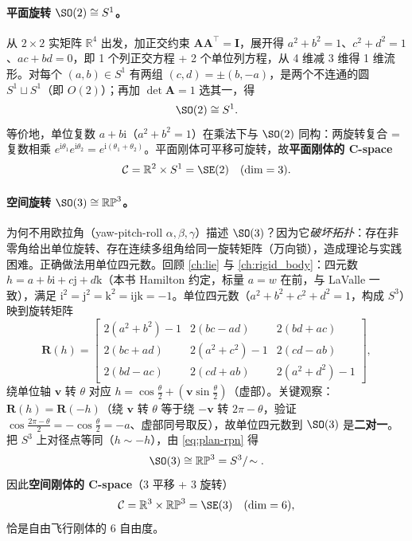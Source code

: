 \paragraph{平面旋转 $\SO(2)\cong S^1$。}
从 $2\times2$ 实矩阵 $\mathbb{R}^4$ 出发，加正交约束 $\mathbf{A}\mathbf{A}^\top=\mathbf{I}$，展开得 $a^2+b^2=1$、$c^2+d^2=1$、$ac+bd=0$，即 1 个列正交方程 + 2 个单位列方程，从 4 维减 3 维得 1 维流形。对每个 $(a,b)\in S^1$ 有两组 $(c,d)=\pm(b,-a)$，是两个不连通的圆 $S^1\sqcup S^1$（即 $O(2)$）；再加 $\det\mathbf{A}=1$ 选其一，得
\begin{equation}
  \SO(2)\cong S^1.
  \label{eq:plan-so2}
\end{equation}
等价地，单位复数 $a+b\mathrm{i}$（$a^2+b^2=1$）在乘法下与 $\SO(2)$ 同构：两旋转复合 = 复数相乘 $e^{\mathrm{i}\theta_1}e^{\mathrm{i}\theta_2}=e^{\mathrm{i}(\theta_1+\theta_2)}$。平面刚体可平移可旋转，故\textbf{平面刚体的 C-space}
\begin{equation}
  \mathcal{C}=\mathbb{R}^2\times S^1=\SE(2)\quad(\dim=3).
  \label{eq:plan-se2}
\end{equation}

\paragraph{空间旋转 $\SO(3)\cong\mathbb{RP}^3$。}
为何不用欧拉角（yaw-pitch-roll $\alpha,\beta,\gamma$）描述 $\SO(3)$？因为它\emph{破坏拓扑}：存在非零角给出单位旋转、存在连续多组角给同一旋转矩阵（万向锁），造成理论与实践困难。正确做法用单位四元数。回顾 \cref{ch:lie} 与 \cref{ch:rigid_body}：四元数 $h=a+b\mathrm{i}+c\mathrm{j}+d\mathrm{k}$（本书 Hamilton 约定，标量 $a=w$ 在前，与 LaValle 一致），满足 $\mathrm{i}^2=\mathrm{j}^2=\mathrm{k}^2=\mathrm{i}\mathrm{j}\mathrm{k}=-1$。单位四元数（$a^2+b^2+c^2+d^2=1$，构成 $S^3$）映到旋转矩阵
\begin{equation}
  \mathbf{R}(h)=\begin{bmatrix}2(a^2+b^2)-1&2(bc-ad)&2(bd+ac)\\2(bc+ad)&2(a^2+c^2)-1&2(cd-ab)\\2(bd-ac)&2(cd+ab)&2(a^2+d^2)-1\end{bmatrix},
  \label{eq:plan-quat2rot}
\end{equation}
绕单位轴 $\mathbf{v}$ 转 $\theta$ 对应 $h=\cos\tfrac\theta2+(\mathbf{v}\sin\tfrac\theta2)$（虚部）。关键观察：$\mathbf{R}(h)=\mathbf{R}(-h)$（绕 $\mathbf{v}$ 转 $\theta$ 等于绕 $-\mathbf{v}$ 转 $2\pi-\theta$，验证 $\cos\tfrac{2\pi-\theta}2=-\cos\tfrac\theta2=-a$、虚部同号取反），故单位四元数到 $\SO(3)$ 是\textbf{二对一}。把 $S^3$ 上对径点等同（$h\sim-h$），由 \cref{eq:plan-rpn} 得
\begin{equation}
  \SO(3)\cong\mathbb{RP}^3=S^3/\!\sim.
  \label{eq:plan-so3rp3}
\end{equation}
因此\textbf{空间刚体的 C-space}（3 平移 + 3 旋转）
\begin{equation}
  \mathcal{C}=\mathbb{R}^3\times\mathbb{RP}^3=\SE(3)\quad(\dim=6),
  \label{eq:plan-se3}
\end{equation}
恰是自由飞行刚体的 6 自由度。

